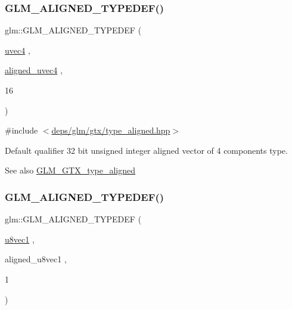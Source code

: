 \subsubsection{\texorpdfstring{G\+L\+M\+\_\+\+A\+L\+I\+G\+N\+E\+D\+\_\+\+T\+Y\+P\+E\+D\+E\+F()}{GLM\_ALIGNED\_TYPEDEF()}\hspace{0.1cm}{\footnotesize\ttfamily [120/209]}}
{\footnotesize\ttfamily glm\+::\+G\+L\+M\+\_\+\+A\+L\+I\+G\+N\+E\+D\+\_\+\+T\+Y\+P\+E\+D\+EF (\begin{DoxyParamCaption}\item[{\hyperlink{group__core__types_ga1c426d19627b32b14f0089f7f4ba7b1d}{uvec4}}]{,  }\item[{\hyperlink{group__gtc__type__aligned_ga1e0792f3c64836e042ee3aad9bd8209c}{aligned\+\_\+uvec4}}]{,  }\item[{16}]{ }\end{DoxyParamCaption})}



{\ttfamily \#include $<$\hyperlink{gtx_2type__aligned_8hpp}{deps/glm/gtx/type\+\_\+aligned.\+hpp}$>$}

Default qualifier 32 bit unsigned integer aligned vector of 4 components type. \begin{DoxySeeAlso}{See also}
\hyperlink{group__gtx__type__aligned}{G\+L\+M\+\_\+\+G\+T\+X\+\_\+type\+\_\+aligned} 
\end{DoxySeeAlso}
\mbox{\label{group__gtx__type__aligned_ga5611d6718e3a00096918a64192e73a45}} 
\subsubsection{\texorpdfstring{G\+L\+M\+\_\+\+A\+L\+I\+G\+N\+E\+D\+\_\+\+T\+Y\+P\+E\+D\+E\+F()}{GLM\_ALIGNED\_TYPEDEF()}\hspace{0.1cm}{\footnotesize\ttfamily [121/209]}}
{\footnotesize\ttfamily glm\+::\+G\+L\+M\+\_\+\+A\+L\+I\+G\+N\+E\+D\+\_\+\+T\+Y\+P\+E\+D\+EF (\begin{DoxyParamCaption}\item[{\hyperlink{group__gtc__type__precision_ga5b0875b5979b80a0ccb371bf7f0f95d8}{u8vec1}}]{,  }\item[{aligned\+\_\+u8vec1}]{,  }\item[{1}]{ }\end{DoxyParamCaption})}




